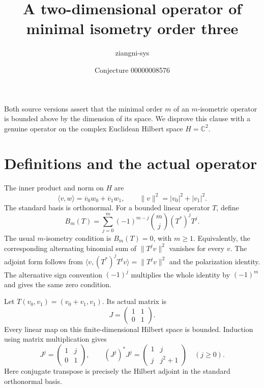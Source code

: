\documentclass[10pt]{article}
\title{A two-dimensional operator of minimal isometry order three}
\author{ziangni-sys}
\date{Conjecture 00000008576}
\begin{document}
\raggedright
\maketitle
\noindent Both source versions assert that the minimal order $m$ of an
$m$-isometric operator is bounded above by the dimension of its space.
We disprove this clause with a genuine operator on the complex Euclidean
Hilbert space $H=\mathbb C^2$.

\section*{Definitions and the actual operator}
The inner product and norm on $H$ are
\[
 \langle v,w\rangle=\overline v_0w_0+\overline v_1w_1,
 \qquad \|v\|^2=|v_0|^2+|v_1|^2.
\]
The standard basis is orthonormal. For a bounded linear operator $T$, define
\[
 B_m(T)=\sum_{j=0}^m(-1)^{m-j}\binom mj(T^*)^jT^j.
\]
The usual $m$-isometry condition is $B_m(T)=0$, with $m\geq1$.
Equivalently, the corresponding alternating binomial sum of
$\|T^jv\|^2$ vanishes for every $v$. The adjoint form follows from
$\langle v,(T^*)^jT^jv\rangle=\|T^jv\|^2$ and the polarization identity.
The alternative sign convention $(-1)^j$ multiplies the whole identity by
$(-1)^m$ and gives the same zero condition.

Let $T(v_0,v_1)=(v_0+v_1,v_1)$. Its actual matrix is
\[
 J=\begin{pmatrix}1&1\\0&1\end{pmatrix}.
\]
Every linear map on this finite-dimensional Hilbert space is bounded.
Induction using matrix multiplication gives
\[
 J^j=\begin{pmatrix}1&j\\0&1\end{pmatrix},\qquad
 (J^j)^*J^j=\begin{pmatrix}1&j\\j&j^2+1\end{pmatrix}
 \quad(j\geq0).
\]
Here conjugate transpose is precisely the Hilbert adjoint in the standard
orthonormal basis.
\end{document}
